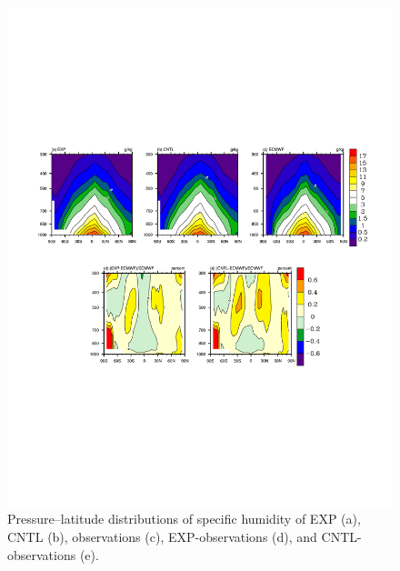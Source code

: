 \documentclass[gmd, manuscript]{copernicus}
\begin{document}
\begin{figure}[t]
\includegraphics[width=15.3cm]{shum}
\caption{Pressure--latitude distributions of specific humidity of EXP (a), CNTL (b), observations (c), EXP-observations (d), and CNTL-observations (e).}
\end{figure}
\end{document}
